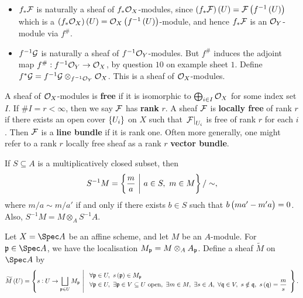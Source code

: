 \begin{definition*}
\begin{itemize}
\begin{itemize}
\item $ f_*\mathcal{F} $ is naturally a sheaf of $ f_*\mathcal{O}_X $-modules, since $ \br{f_*\FFF}\br{U} = \FFF\br{f^{-1}\br{U}} $ which is a $ \br{f_*\OOO_X}\br{U} = \OOO_X\br{f^{-1}\br{U}} $-module, and hence $ f_*\mathcal{F} $ is an $ \mathcal{O}_Y $-module via $ f^\# $.
\item $ f^{-1}\mathcal{G} $ is naturally a sheaf of $ f^{-1}\mathcal{O}_Y $-modules. But $ f^\# $ induces the adjoint map $ f^\# : f^{-1}\mathcal{O}_Y \to \mathcal{O}_X $, by question $ 10 $ on example sheet $ 1 $. Define $ f^*\mathcal{G} = f^{-1}\mathcal{G} \otimes_{f^{-1}\mathcal{O}_Y} \mathcal{O}_X $. This is a sheaf of $ \mathcal{O}_X $-modules.
\end{itemize}
\end{itemize}
\end{definition*}

\begin{definition*}
A sheaf of $ \mathcal{O}_X $-modules is \textbf{free} if it is isomorphic to $ \bigoplus_{i \in I} \mathcal{O}_X $ for some index set $ I $. If $ \#I = r < \infty $, then we say $ \mathcal{F} $ has \textbf{rank} $ r $. A sheaf $ \mathcal{F} $ is \textbf{locally free} of rank $ r $ if there exists an open cover $ \cbr{U_i} $ on $ X $ such that $ \left. \mathcal{F} \right|_{U_i} $ is free of rank $ r $ for each $ i $. Then $ \mathcal{F} $ is a \textbf{line bundle} if it is rank one. Often more generally, one might refer to a rank $ r $ locally free sheaf as a rank $ r $ \textbf{vector bundle}.
\end{definition*}

If $ S \subseteq A $ is a multiplicatively closed subset, then
$$ S^{-1}M = \cbr{\dfrac{m}{a} \st a \in S, \ m \in M} / \sim, $$
where $ m / a \sim m / a' $ if and only if there exists $ b \in S $ such that $ b\br{ma' - m'a} = 0 $. Also, $ S^{-1}M = M \otimes_A S^{-1}A $.

\begin{example*}
Let $ X = \Spec A $ be an affine scheme, and let $ M $ be an $ A $-module. For $ \ppp \in \Spec A $, we have the localisation $ M_{\mathfrak{p}} = M \otimes_A A_{\mathfrak{p}} $. Define a sheaf $ \widetilde{M} $ on $ \Spec A $ by
$$ \widetilde{M}\br{U} = \cbr{s : U \to \bigsqcup_{\ppp \in U} M_\ppp \st \begin{array}{l} \forall \ppp \in U, \ s\br{\ppp} \in M_\ppp \\ \forall \ppp \in U, \ \exists \ppp \in V \subseteq U \ \text{open}, \ \exists m \in M, \ \exists s \in A, \ \forall \qqq \in V, \ s \notin \qqq, \ s\br{\qqq} = \dfrac{m}{s} \end{array}}. $$
\end{example*}

